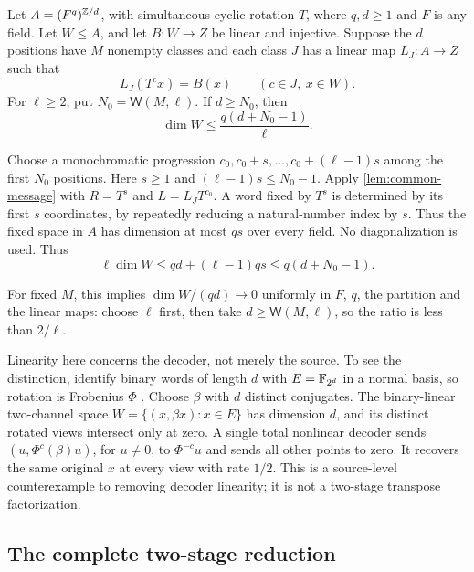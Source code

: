 \begin{theorem}\label{thm:message-rate}
Let $A=(F^q)^{\mathbb{Z}/d}$, with simultaneous cyclic rotation $T$, where
$q,d\ge1$ and $F$ is any field.  Let $W\le A$, and let
$B\colon W\to Z$ be linear and injective.  Suppose the $d$ positions
have $M$ nonempty classes and each class $J$ has a linear map
$L_J\colon A\to Z$ such that
\[
 L_J(T^cx)=B(x)\qquad(c\in J,\ x\in W).
\]
For $\ell\ge2$, put $N_0=\mathsf W(M,\ell)$.  If $d\ge N_0$, then
\begin{equation}\label{eq:message-rate}
 \dim W\le \frac{q(d+N_0-1)}{\ell}.
\end{equation}
\end{theorem}
\begin{outline}
Choose a monochromatic progression
$c_0,c_0+s,\ldots,c_0+(\ell-1)s$ among the first $N_0$ positions.
Here $s\ge1$ and $(\ell-1)s\le N_0-1$.
Apply \cref{lem:common-message} with $R=T^s$ and
$L=L_JT^{c_0}$.  A word fixed by $T^s$ is determined by its first
$s$ coordinates, by repeatedly reducing a natural-number index by $s$.
Thus the fixed space in $A$ has dimension at most $qs$ over every field.
No diagonalization is used.
Thus
\[
 \ell\dim W\le qd+(\ell-1)qs
 \le q(d+N_0-1).
\]
\end{outline}

For fixed $M$, this implies $\dim W/(qd)\to0$ uniformly in $F$, $q$,
the partition and the linear maps: choose $\ell$ first, then take
$d\ge\mathsf W(M,\ell)$, so the ratio is less than $2/\ell$.

Linearity here concerns the decoder, not merely the source.  To see the
distinction, identify binary words of length $d$ with $E=\mathbb{F}_{2^d}$ in a
normal basis, so rotation is Frobenius $\Phi$ \cite{Milne2022}.  Choose $\beta$ with
$d$ distinct conjugates.  The binary-linear two-channel space
$W=\{(x,\beta x):x\in E\}$ has dimension $d$, and its distinct rotated
views intersect only at zero.  A single total nonlinear decoder sends
$(u,\Phi^c(\beta)u)$, for $u\ne0$, to $\Phi^{-c}u$ and sends all other
points to zero.  It recovers the same original $x$ at every view with
rate $1/2$.  This is a source-level counterexample to removing decoder
linearity; it is not a two-stage transpose factorization.

\subsection{The complete two-stage reduction}

